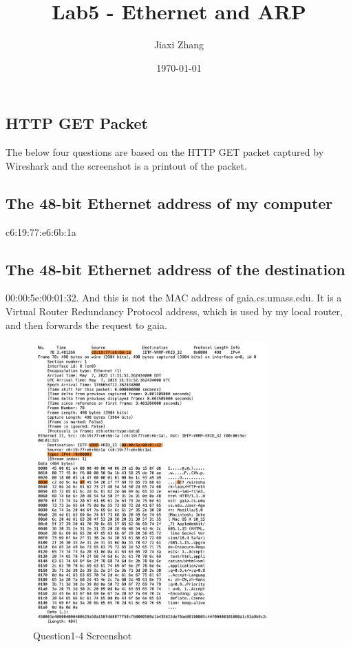 \documentclass{article}
\title{Lab5 - Ethernet and ARP}
\author{Jiaxi Zhang}
\date{\today}
\begin{document}
\maketitle
\begin{CJK*}{UTF8}{gbsn}

\section{HTTP GET Packet}
The below four questions are based on the HTTP GET packet captured by Wireshark and
the screenshot is a printout of the packet.

\subsection{The 48-bit Ethernet address of my computer}
c6:19:77:e6:6b:1a
\subsection{The 48-bit Ethernet address of the destination}
00:00:5e:00:01:32. And this is not the MAC address of gaia.cs.umass.edu. 
It is a Virtual Router Redundancy Protocol address, which is used by my local router, and then forwards the request to gaia.
\begin{figure}[H]
    \centering
    \includegraphics[width=0.8\textwidth]{1.png}
    \caption{Question1-4 Screenshot}
\end{figure}

\end{CJK*}
\end{document}
